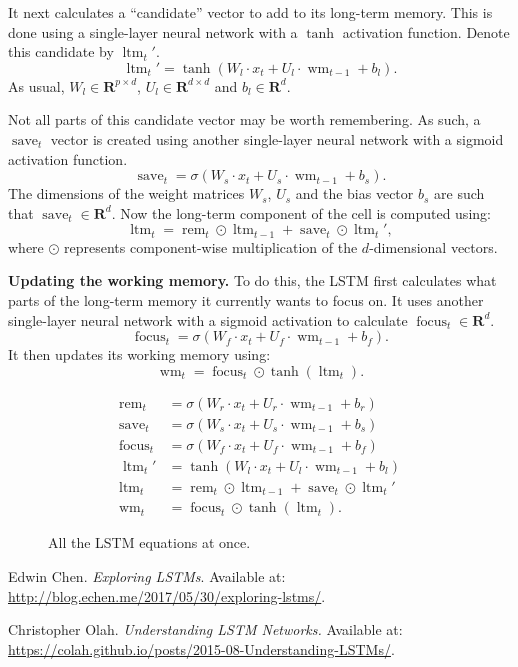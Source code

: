 \documentclass[12pt]{article}
\theoremstyle{definition}
\newcommand{\R}{\ensuremath{\bm{R}}}
\DeclareMathOperator{\rem}{rem}
\DeclareMathOperator{\save}{save}
\DeclareMathOperator{\focus}{focus}
\DeclareMathOperator{\ltm}{ltm}
\DeclareMathOperator{\wm}{wm}
\begin{document}
It next calculates a ``candidate'' vector to add to its long-term memory. This
is done using a single-layer neural network with a $\tanh$ activation function.
Denote this candidate by $\ltm_{t}'$.
\begin{equation}
\ltm_{t}' = \tanh \left ( W_l \cdot x_t + U_l \cdot \wm_{t - 1} + b_l \right ).
\end{equation}
As usual, $W_l \in \R^{p \times d}$, $U_l \in \R^{d \times d}$ and $b_l \in \R^{d}$.

Not all parts of this candidate vector may be worth remembering. As such, a
$\save_{t}$ vector is created using another single-layer neural network with a
sigmoid activation function.
\begin{equation}
\save_{t} = \sigma \left ( W_s \cdot x_t + U_s \cdot \wm_{t - 1} + b_s \right ).
\end{equation}
The dimensions of the weight matrices $W_s$, $U_s$ and the bias vector $b_s$
are such that $\save_{t} \in \R^{d}$.
Now the long-term component of the cell is computed using:
\begin{equation}
\ltm_{t} = \rem_{t} \odot \ltm_{t - 1} + \save_{t} \odot \ltm_{t}',
\end{equation}
where $\odot$ represents component-wise multiplication of the $d$-dimensional
vectors.

\medskip
\noindent \textbf{Updating the working memory.} To do this, the LSTM first
calculates what parts of the long-term memory it currently wants to focus on.
It uses another single-layer neural network with a sigmoid activation to
calculate $\focus_{t} \in \R^{d}$.
\begin{equation}
\focus_{t} = \sigma \left ( W_f \cdot x_t + U_f \cdot \wm_{t - 1} + b_f \right ).
\end{equation}
It then updates its working memory using:
\begin{equation}
\wm_{t} = \focus_{t} \odot \tanh(\ltm_{t}).
\end{equation}


\begin{figure}[ht]
\begin{tcolorbox}
\begin{align*}
    \rem_{t}   & = \sigma \left ( W_r \cdot x_t + U_r \cdot \wm_{t - 1} + b_r \right ) \\
    \save_{t}  & = \sigma \left ( W_s \cdot x_t + U_s \cdot \wm_{t - 1} + b_s \right ) \\
    \focus_{t} & = \sigma \left ( W_f \cdot x_t + U_f \cdot \wm_{t - 1} + b_f \right ) \\
    \ltm_{t}'  & = \tanh \left ( W_l \cdot x_t + U_l \cdot \wm_{t - 1} + b_l \right ) \\
    \ltm_{t}   & = \rem_{t} \odot \ltm_{t - 1} + \save_{t} \odot \ltm_{t}' \\
    \wm_{t}    & = \focus_{t} \odot \tanh(\ltm_{t}).
\end{align*}
\end{tcolorbox}
\caption{All the LSTM equations at once.}
\end{figure}



 Edwin Chen. \emph{Exploring LSTMs}. Available at:
\url{http://blog.echen.me/2017/05/30/exploring-lstms/}.

 Christopher Olah. \emph{Understanding LSTM Networks.} Available at:
\url{https://colah.github.io/posts/2015-08-Understanding-LSTMs/}.
\end{document}
